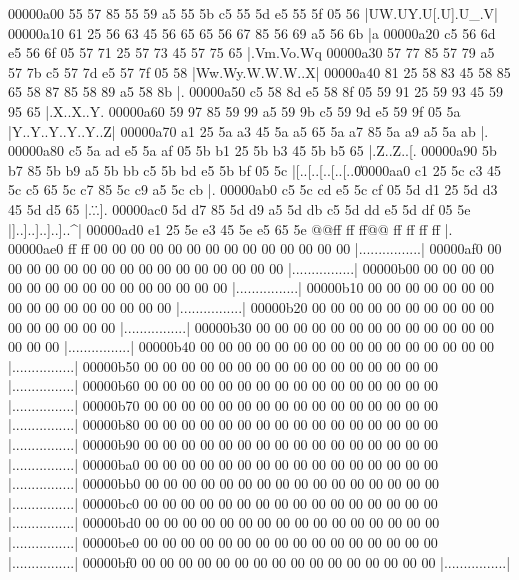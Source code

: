 \documentclass{article}
\begin{document}
    \begin{hexlsting}
        00000a00  55 57 85 55 59 a5 55 5b  c5 55 5d e5 55 5f 05 56  |UW.UY.U[.U].U_.V|
        00000a10  61 25 56 63 45 56 65 65  56 67 85 56 69 a5 56 6b  |a%
        00000a20  c5 56 6d e5 56 6f 05 57  71 25 57 73 45 57 75 65  |.Vm.Vo.Wq%
        00000a30  57 77 85 57 79 a5 57 7b  c5 57 7d e5 57 7f 05 58  |Ww.Wy.W{.W}.W..X|
        00000a40  81 25 58 83 45 58 85 65  58 87 85 58 89 a5 58 8b  |.%
        00000a50  c5 58 8d e5 58 8f 05 59  91 25 59 93 45 59 95 65  |.X..X..Y.%
        00000a60  59 97 85 59 99 a5 59 9b  c5 59 9d e5 59 9f 05 5a  |Y..Y..Y..Y..Y..Z|
        00000a70  a1 25 5a a3 45 5a a5 65  5a a7 85 5a a9 a5 5a ab  |.%
        00000a80  c5 5a ad e5 5a af 05 5b  b1 25 5b b3 45 5b b5 65  |.Z..Z..[.%
        00000a90  5b b7 85 5b b9 a5 5b bb  c5 5b bd e5 5b bf 05 5c  |[..[..[..[..[..\|
        00000aa0  c1 25 5c c3 45 5c c5 65  5c c7 85 5c c9 a5 5c cb  |.%
        00000ab0  c5 5c cd e5 5c cf 05 5d  d1 25 5d d3 45 5d d5 65  |.\..\..].%
        00000ac0  5d d7 85 5d d9 a5 5d db  c5 5d dd e5 5d df 05 5e  |]..]..]..]..]..^|
        00000ad0  e1 25 5e e3 45 5e e5 65  5e @@ff ff ff@@ ff ff ff ff  |.%
        00000ae0  ff ff 00 00 00 00 00 00  00 00 00 00 00 00 00 00  |................|
        00000af0  00 00 00 00 00 00 00 00  00 00 00 00 00 00 00 00  |................|
        00000b00  00 00 00 00 00 00 00 00  00 00 00 00 00 00 00 00  |................|
        00000b10  00 00 00 00 00 00 00 00  00 00 00 00 00 00 00 00  |................|
        00000b20  00 00 00 00 00 00 00 00  00 00 00 00 00 00 00 00  |................|
        00000b30  00 00 00 00 00 00 00 00  00 00 00 00 00 00 00 00  |................|
        00000b40  00 00 00 00 00 00 00 00  00 00 00 00 00 00 00 00  |................|
        00000b50  00 00 00 00 00 00 00 00  00 00 00 00 00 00 00 00  |................|
        00000b60  00 00 00 00 00 00 00 00  00 00 00 00 00 00 00 00  |................|
        00000b70  00 00 00 00 00 00 00 00  00 00 00 00 00 00 00 00  |................|
        00000b80  00 00 00 00 00 00 00 00  00 00 00 00 00 00 00 00  |................|
        00000b90  00 00 00 00 00 00 00 00  00 00 00 00 00 00 00 00  |................|
        00000ba0  00 00 00 00 00 00 00 00  00 00 00 00 00 00 00 00  |................|
        00000bb0  00 00 00 00 00 00 00 00  00 00 00 00 00 00 00 00  |................|
        00000bc0  00 00 00 00 00 00 00 00  00 00 00 00 00 00 00 00  |................|
        00000bd0  00 00 00 00 00 00 00 00  00 00 00 00 00 00 00 00  |................|
        00000be0  00 00 00 00 00 00 00 00  00 00 00 00 00 00 00 00  |................|
        00000bf0  00 00 00 00 00 00 00 00  00 00 00 00 00 00 00 00  |................|
    \end{hexlsting}
    \clearpage
\end{document}

